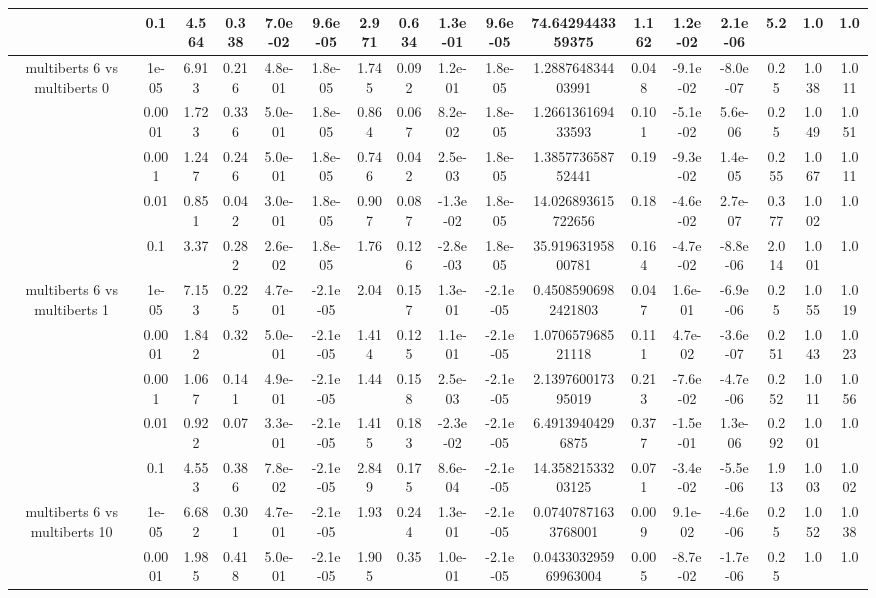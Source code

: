 \begin{tabular}{|c|c|c|c|c|c|c|c|c|c|c|c|c|c|c|c|c|}
 & 0.1 & 4.564 & 0.338 & 7.0e-02 & 9.6e-05 & 2.971 & 0.634 & 1.3e-01 & 9.6e-05 & 74.6429443359375 & 1.162 & 1.2e-02 & 2.1e-06 & 5.2 & 1.0 & 1.0 \\
\hline
\multirow{5}{*}{multiberts 6 vs multiberts 0} & 1e-05 & 6.913 & 0.216 & 4.8e-01 & 1.8e-05 & 1.745 & 0.092 & 1.2e-01 & 1.8e-05 & 1.288764834403991 & 0.048 & -9.1e-02 & -8.0e-07 & 0.25 & 1.038 & 1.011 \\
 & 0.0001 & 1.723 & 0.336 & 5.0e-01 & 1.8e-05 & 0.864 & 0.067 & 8.2e-02 & 1.8e-05 & 1.266136169433593 & 0.101 & -5.1e-02 & 5.6e-06 & 0.25 & 1.049 & 1.051 \\
 & 0.001 & 1.247 & 0.246 & 5.0e-01 & 1.8e-05 & 0.746 & 0.042 & 2.5e-03 & 1.8e-05 & 1.385773658752441 & 0.19 & -9.3e-02 & 1.4e-05 & 0.255 & 1.067 & 1.011 \\
 & 0.01 & 0.851 & 0.042 & 3.0e-01 & 1.8e-05 & 0.907 & 0.087 & -1.3e-02 & 1.8e-05 & 14.026893615722656 & 0.18 & -4.6e-02 & 2.7e-07 & 0.377 & 1.002 & 1.0 \\
 & 0.1 & 3.37 & 0.282 & 2.6e-02 & 1.8e-05 & 1.76 & 0.126 & -2.8e-03 & 1.8e-05 & 35.91963195800781 & 0.164 & -4.7e-02 & -8.8e-06 & 2.014 & 1.001 & 1.0 \\
\hline
\multirow{5}{*}{multiberts 6 vs multiberts 1} & 1e-05 & 7.153 & 0.225 & 4.7e-01 & -2.1e-05 & 2.04 & 0.157 & 1.3e-01 & -2.1e-05 & 0.45085906982421803 & 0.047 & 1.6e-01 & -6.9e-06 & 0.25 & 1.055 & 1.019 \\
 & 0.0001 & 1.842 & 0.32 & 5.0e-01 & -2.1e-05 & 1.414 & 0.125 & 1.1e-01 & -2.1e-05 & 1.070657968521118 & 0.111 & 4.7e-02 & -3.6e-07 & 0.251 & 1.043 & 1.023 \\
 & 0.001 & 1.067 & 0.141 & 4.9e-01 & -2.1e-05 & 1.44 & 0.158 & 2.5e-03 & -2.1e-05 & 2.139760017395019 & 0.213 & -7.6e-02 & -4.7e-06 & 0.252 & 1.011 & 1.056 \\
 & 0.01 & 0.922 & 0.07 & 3.3e-01 & -2.1e-05 & 1.415 & 0.183 & -2.3e-02 & -2.1e-05 & 6.49139404296875 & 0.377 & -1.5e-01 & 1.3e-06 & 0.292 & 1.001 & 1.0 \\
 & 0.1 & 4.553 & 0.386 & 7.8e-02 & -2.1e-05 & 2.849 & 0.175 & 8.6e-04 & -2.1e-05 & 14.35821533203125 & 0.071 & -3.4e-02 & -5.5e-06 & 1.913 & 1.003 & 1.002 \\
\hline
\multirow{5}{*}{multiberts 6 vs multiberts 10} & 1e-05 & 6.682 & 0.301 & 4.7e-01 & -2.1e-05 & 1.93 & 0.244 & 1.3e-01 & -2.1e-05 & 0.07407871633768001 & 0.009 & 9.1e-02 & -4.6e-06 & 0.25 & 1.052 & 1.038 \\
 & 0.0001 & 1.985 & 0.418 & 5.0e-01 & -2.1e-05 & 1.905 & 0.35 & 1.0e-01 & -2.1e-05 & 0.043303295969963004 & 0.005 & -8.7e-02 & -1.7e-06 & 0.25 & 1.0 & 1.0 \\

\end{tabular}
